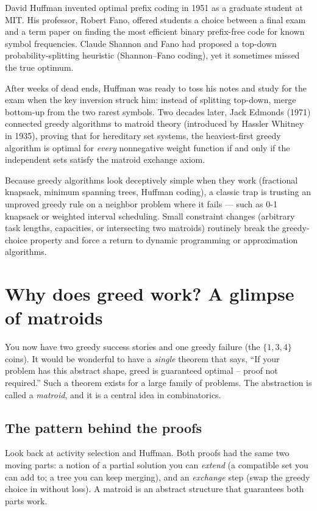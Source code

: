 \begin{historybox}
David Huffman invented optimal prefix coding in 1951 as a graduate student at MIT. His professor, Robert Fano, offered students a choice between a final exam and a term paper on finding the most efficient binary prefix-free code for known symbol frequencies. Claude Shannon and Fano had proposed a top-down probability-splitting heuristic (Shannon--Fano coding), yet it sometimes missed the true optimum.

After weeks of dead ends, Huffman was ready to toss his notes and study for the exam when the key inversion struck him: instead of splitting top-down, merge bottom-up from the two rarest symbols. Two decades later, Jack Edmonds (1971) connected greedy algorithms to matroid theory (introduced by Hassler Whitney in 1935), proving that for hereditary set systems, the heaviest-first greedy algorithm is optimal for \emph{every} nonnegative weight function if and only if the independent sets satisfy the matroid exchange axiom.

Because greedy algorithms look deceptively simple when they work (fractional knapsack, minimum spanning trees, Huffman coding), a classic trap is trusting an unproved greedy rule on a neighbor problem where it fails --- such as 0-1 knapsack or weighted interval scheduling. Small constraint changes (arbitrary task lengths, capacities, or intersecting two matroids) routinely break the greedy-choice property and force a return to dynamic programming or approximation algorithms.
\end{historybox}

\section{Why does greed work? A glimpse of matroids}

You now have two greedy success stories and one greedy failure (the $\{1,3,4\}$
coins). It would be wonderful to have a \emph{single} theorem that says, ``If your
problem has this abstract shape, greed is guaranteed optimal -- proof not
required.'' Such a theorem exists for a large family of problems. The
abstraction is called a \emph{matroid}, and it is a central idea in
combinatorics.

\subsection{The pattern behind the proofs}

Look back at activity selection and Huffman. Both proofs had the same two moving
parts: a notion of a partial solution you can \emph{extend} (a compatible set you
can add to; a tree you can keep merging), and an \emph{exchange} step (swap the
greedy choice in without loss). A matroid is an abstract structure that
guarantees both parts work.

